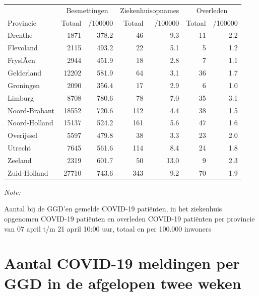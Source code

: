\documentclass[
  english,
  man,floatsintext]{apa6}
\begin{document}
\begin{table}
\centering
\begin{threeparttable}
\begin{tabular}{lrrrrrr}
\toprule
\multicolumn{1}{c}{ } & \multicolumn{2}{c}{Besmettingen} & \multicolumn{2}{c}{Ziekenhuisopnames} & \multicolumn{2}{c}{Overleden} \\
\cmidrule(l{3pt}r{3pt}){2-3} \cmidrule(l{3pt}r{3pt}){4-5} \cmidrule(l{3pt}r{3pt}){6-7}
Provincie & Totaal & /100000 & Totaal & /100000 & Totaal & /100000\\
\midrule
Drenthe & 1871 & 378.2 & 46 & 9.3 & 11 & 2.2\\
Flevoland & 2115 & 493.2 & 22 & 5.1 & 5 & 1.2\\
FryslÃ¢n & 2944 & 451.9 & 18 & 2.8 & 7 & 1.1\\
Gelderland & 12202 & 581.9 & 64 & 3.1 & 36 & 1.7\\
Groningen & 2090 & 356.4 & 17 & 2.9 & 6 & 1.0\\
Limburg & 8708 & 780.6 & 78 & 7.0 & 35 & 3.1\\
Noord-Brabant & 18552 & 720.6 & 112 & 4.4 & 38 & 1.5\\
Noord-Holland & 15137 & 524.2 & 161 & 5.6 & 47 & 1.6\\
Overijssel & 5597 & 479.8 & 38 & 3.3 & 23 & 2.0\\
Utrecht & 7645 & 561.6 & 114 & 8.4 & 24 & 1.8\\
Zeeland & 2319 & 601.7 & 50 & 13.0 & 9 & 2.3\\
Zuid-Holland & 27710 & 743.6 & 343 & 9.2 & 70 & 1.9\\
\bottomrule
\end{tabular}
\begin{tablenotes}
\item \textit{Note: } 
\item Aantal bij de GGD’en gemelde COVID-19 patiënten, in het ziekenhuis opgenomen COVID-19 patiënten en overleden COVID-19 patiënten per provincie van 07 april t/m 21 april 10:00 uur, totaal en per 100.000 inwoners
\end{tablenotes}
\end{threeparttable}
\end{table}

\newpage

\hypertarget{aantal-covid-19-meldingen-per-ggd-in-de-afgelopen-twee-weken}{%
\section{Aantal COVID-19 meldingen per GGD in de afgelopen twee weken}\label{aantal-covid-19-meldingen-per-ggd-in-de-afgelopen-twee-weken}}
\end{document}
